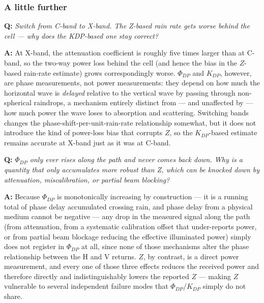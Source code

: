 \documentclass[11pt]{article}
\newenvironment{qa}[1]{\par\noindent\textbf{\color{qgray}Q: }\emph{#1}\par\noindent\textbf{A: }}{\par\vspace{6pt}}
\newcommand{\tier}[1]{\subsubsection*{#1}}
\begin{document}
\tier{A little further}
\begin{qa}{Switch from C-band to X-band. The Z-based rain rate gets worse behind the cell --- why does the KDP-based one stay correct?}
At X-band, the attenuation coefficient is roughly five times larger than at C-band, so the two-way power loss behind the cell (and hence the bias in the $Z$-based rain-rate estimate) grows correspondingly worse. $\Phi_{DP}$ and $K_{DP}$, however, are phase measurements, not power measurements: they depend on how much the horizontal wave is \emph{delayed} relative to the vertical wave by passing through non-spherical raindrops, a mechanism entirely distinct from --- and unaffected by --- how much power the wave loses to absorption and scattering. Switching bands changes the phase-shift-per-unit-rain-rate relationship somewhat, but it does not introduce the kind of power-loss bias that corrupts $Z$, so the $K_{DP}$-based estimate remains accurate at X-band just as it was at C-band.
\end{qa}
\begin{qa}{$\Phi_{DP}$ only ever rises along the path and never comes back down. Why is a quantity that only accumulates more robust than Z, which can be knocked down by attenuation, miscalibration, or partial beam blocking?}
Because $\Phi_{DP}$ is monotonically increasing by construction --- it is a running total of phase delay accumulated crossing rain, and phase delay from a physical medium cannot be negative --- any drop in the measured signal along the path (from attenuation, from a systematic calibration offset that under-reports power, or from partial beam blockage reducing the effective illuminated power) simply does not register in $\Phi_{DP}$ at all, since none of those mechanisms alter the phase relationship between the H and V returns. $Z$, by contrast, is a direct power measurement, and every one of those three effects reduces the received power and therefore directly and indistinguishably lowers the reported $Z$ --- making $Z$ vulnerable to several independent failure modes that $\Phi_{DP}$/$K_{DP}$ simply do not share.
\end{qa}
\end{document}
